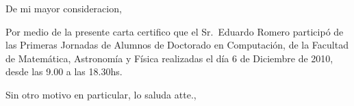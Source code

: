 \documentclass[12pt,a4paper]{article}
\date{C\'ordoba, 6 de diciembre de 2010}
\begin{document}
\opening{De mi mayor consideracion,}

Por medio de la presente carta certifico que el Sr.\ Eduardo Romero particip\'o de las Primeras Jornadas 
de Alumnos de Doctorado en Computaci\'on, de la Facultad de Matem\'atica, Astronom\'ia y 
F\'isica realizadas el d\'ia 6 de Diciembre de 2010, desde las 9.00 a las 18.30hs. 

\closing{Sin otro motivo en particular, lo saluda atte.,}
\end{document}
